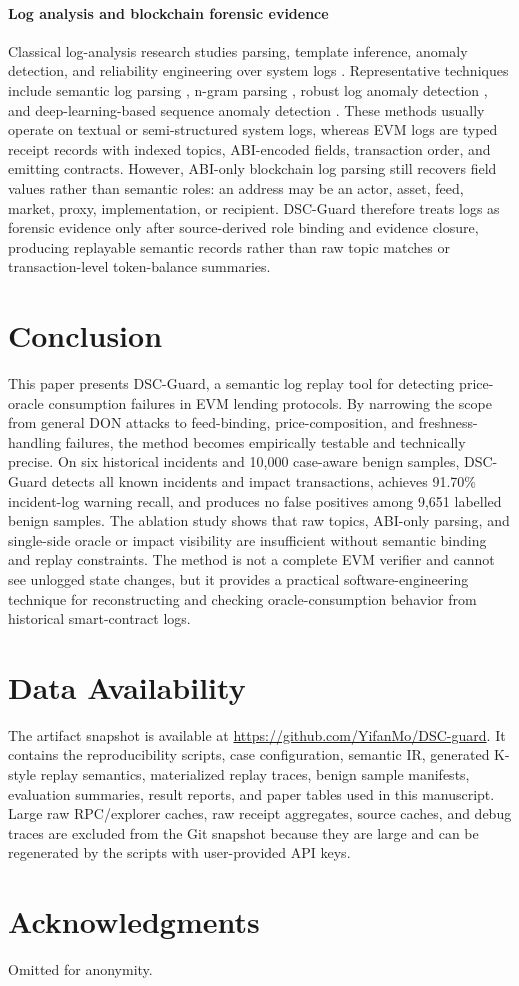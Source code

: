 \documentclass[final,5p]{elsarticle}
\newcommand{\tool}{DSC-Guard\xspace}
\begin{document}
\paragraph{Log analysis and blockchain forensic evidence}
Classical log-analysis research studies parsing, template inference, anomaly detection, and reliability engineering over system logs \cite{he2021survey,he2017drain,le2022log}.
Representative techniques include semantic log parsing \cite{huo2021semparser}, n-gram parsing \cite{dai2020logram}, robust log anomaly detection \cite{zhang2019robust}, and deep-learning-based sequence anomaly detection \cite{du2017deeplog}.
These methods usually operate on textual or semi-structured system logs, whereas EVM logs are typed receipt records with indexed topics, ABI-encoded fields, transaction order, and emitting contracts.
However, ABI-only blockchain log parsing still recovers field values rather than semantic roles: an address may be an actor, asset, feed, market, proxy, implementation, or recipient.
\tool therefore treats logs as forensic evidence only after source-derived role binding and evidence closure, producing replayable semantic records rather than raw topic matches or transaction-level token-balance summaries.

\section{Conclusion}

This paper presents \tool, a semantic log replay tool for detecting price-oracle consumption failures in EVM lending protocols.
By narrowing the scope from general DON attacks to feed-binding, price-composition, and freshness-handling failures, the method becomes empirically testable and technically precise.
On six historical incidents and 10,000 case-aware benign samples, \tool detects all known incidents and impact transactions, achieves 91.70\% incident-log warning recall, and produces no false positives among 9,651 labelled benign samples.
The ablation study shows that raw topics, ABI-only parsing, and single-side oracle or impact visibility are insufficient without semantic binding and replay constraints.
The method is not a complete EVM verifier and cannot see unlogged state changes, but it provides a practical software-engineering technique for reconstructing and checking oracle-consumption behavior from historical smart-contract logs.

\section*{Data Availability}
The artifact snapshot is available at \url{https://github.com/YifanMo/DSC-guard}.
It contains the reproducibility scripts, case configuration, semantic IR, generated K-style replay semantics, materialized replay traces, benign sample manifests, evaluation summaries, result reports, and paper tables used in this manuscript.
Large raw RPC/explorer caches, raw receipt aggregates, source caches, and debug traces are excluded from the Git snapshot because they are large and can be regenerated by the scripts with user-provided API keys.

\section*{Acknowledgments}
Omitted for anonymity.



\end{document}
